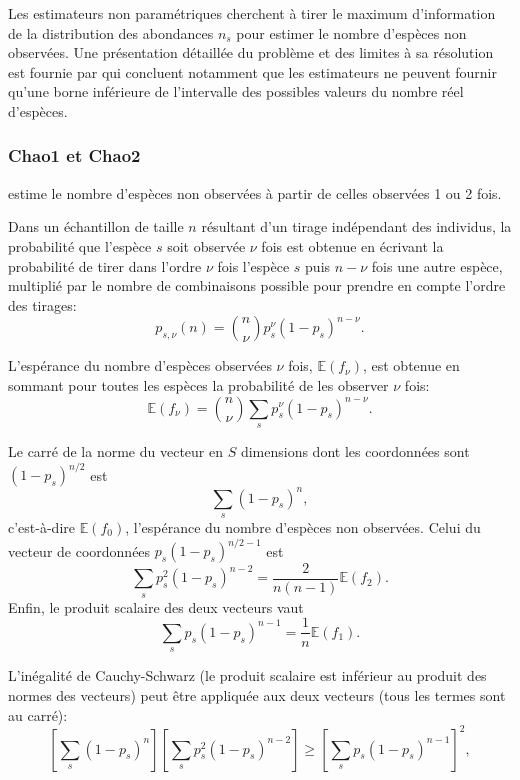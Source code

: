 \documentclass[
  11pt,
  american,
  a4paper,
  extrafontsizes,onecolumn,openright
  ]{memoir}
\begin{document}
Les estimateurs non paramétriques cherchent à tirer le maximum d'information de la distribution des abondances \(n_s\) pour estimer le nombre d'espèces non observées.
Une présentation détaillée du problème et des limites à sa résolution est fournie par \textcite{Mao2005} qui concluent notamment que les estimateurs ne peuvent fournir qu'une borne inférieure de l'intervalle des possibles valeurs du nombre réel d'espèces.

\hypertarget{chao1-et-chao2}{%
\subsubsection{Chao1 et Chao2}\label{chao1-et-chao2}}

\textcite{Chao1984} estime le nombre d'espèces non observées à partir de celles observées 1 ou 2 fois.

Dans un échantillon de taille \(n\) résultant d'un tirage indépendant des individus, la probabilité que l'espèce \(s\) soit observée \(\nu\) fois est obtenue en écrivant la probabilité de tirer dans l'ordre \(\nu\) fois l'espèce \(s\) puis \(n-\nu\) fois une autre espèce, multiplié par le nombre de combinaisons possible pour prendre en compte l'ordre des tirages:
\begin{equation}
  \label{eq:psnu}
  p_{s, \nu}(n) = \binom{n}{\nu} {p_s^\nu \left( 1 - p_s \right)^{n - \nu}}.
\end{equation}

L'espérance du nombre d'espèces observées \(\nu\) fois, \({\mathbb E}(f_{\nu})\), est obtenue en sommant pour toutes les espèces la probabilité de les observer \(\nu\) fois:
\begin{equation}
  \label{eq:Esnnu}
  {\mathbb E}\left( f_{\nu} \right) = \binom{n}{\nu} \sum_s{p_s^\nu \left( 1 - p_s \right)^{n - \nu}}.
\end{equation}

Le carré de la norme du vecteur en \(S\) dimensions dont les coordonnées sont \((1 - p_s)^{n / 2}\) est
\[\sum_s{(1 - p_s)^n},\]
c'est-à-dire \({\mathbb E}(f_{0})\), l'espérance du nombre d'espèces non observées.
Celui du vecteur de coordonnées \(p_s (1 - p_s)^{n / 2 - 1}\) est
\[\sum_s{p_s^2 (1 - p_s)^{n - 2}} = \frac{2}{n (n - 1)}{\mathbb E}(f_{2}).\]
Enfin, le produit scalaire des deux vecteurs vaut
\[\sum_s{p_s (1 - p_s)^{n - 1}} = \frac{1}{n}{\mathbb E}(f_{1}).\]

L'inégalité de Cauchy-Schwarz (le produit scalaire est inférieur au produit des normes des vecteurs) peut être appliquée aux deux vecteurs (tous les termes sont au carré):
\begin{equation}
  \label{eq:CauchySchwarz}
  \left[ \sum_s{(1 - p_s)^n} \right] \left[ \sum_s{p_s^2 (1 - p_s)^{n-2}} \right] 
   \ge \left[ \sum_s{p_s (1 - p_s)^{n-1}} \right]^2,
\end{equation}
\end{document}
